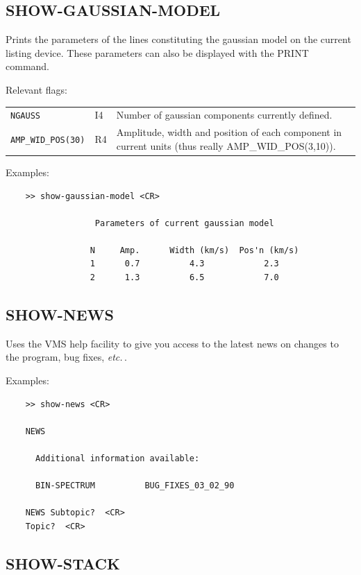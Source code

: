 \documentclass[11pt,twoside]{report}
\newcommand{\etc}{{\it etc.\,}}
\begin{document}
\subsection{SHOW-GAUSSIAN-MODEL} 

Prints the parameters of the lines constituting the gaussian model on the
current listing device. These parameters can also be displayed with the
PRINT command.

Relevant flags:\\
\begin{tabular}{lll}
  \verb+NGAUSS+   & I4 & Number of gaussian components currently defined.\\
  \verb+AMP_WID_POS(30)+ & R4 & \parbox[t]{4in}
                                 {Amplitude, width and position of each
                                  component in current units (thus
                                  really AMP\_WID\_POS(3,10)).}
\end{tabular}

Examples:
\begin{verbatim}
    >> show-gaussian-model <CR>

                  Parameters of current gaussian model

                 N     Amp.      Width (km/s)  Pos'n (km/s)
                 1      0.7          4.3            2.3
                 2      1.3          6.5            7.0
\end{verbatim}

\subsection{SHOW-NEWS} 

Uses the VMS help facility to give you access to the latest news on
changes to the program, bug fixes, \etc.

Examples:
\begin{verbatim}
    >> show-news <CR>

    NEWS

      Additional information available:

      BIN-SPECTRUM          BUG_FIXES_03_02_90

    NEWS Subtopic?  <CR>
    Topic?  <CR>
\end{verbatim}

\subsection{SHOW-STACK} 
\end{document}
